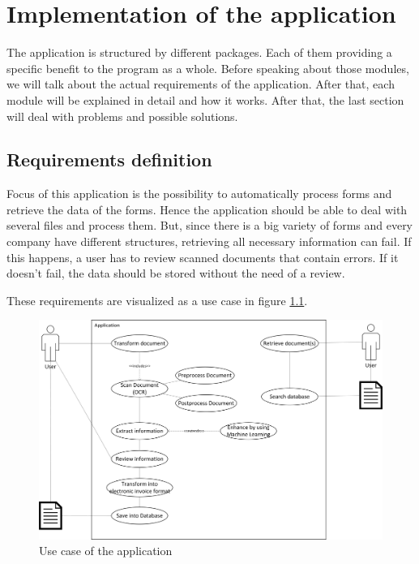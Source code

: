 %
% 
\chapter{Implementation of the application}
\label{cha5}

The application is structured by different packages. Each of them providing a specific benefit to the program as a whole. Before speaking about those modules, we will talk about the actual requirements of the application. After that, each module will be explained in detail and how it works. After that, the last section will deal with problems and possible solutions.

\section{Requirements definition}
\label{sec5.1}

Focus of this application is the possibility to automatically process forms and retrieve the data of the forms. Hence the application should be able to deal with several files and process them. But, since there is a big variety of forms and every company have different structures, retrieving all necessary information can fail. If this happens, a user has to review scanned documents that contain errors. If it doesn't fail, the data should be stored without the need of a review.

These requirements are visualized as a use case in figure \ref{totalApplicationCase}.

\begin{figure}[ht!]
\centering
\includegraphics[width=\textwidth]{Images/UseCase/TotalApplicationCase.jpg}
\caption{Use case of the application \label{totalApplicationCase}}
\end{figure}

